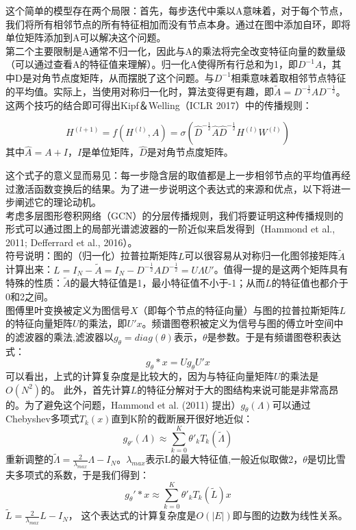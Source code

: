 \documentclass[a4paper,UTF8]{article}
\begin{document}
这个简单的模型存在两个局限：首先，每步迭代中乘以A意味着，对于每个节点，我们将所有相邻节点的所有特征相加而没有节点本身。通过在图中添加自环，即将单位矩阵添加到A可以解决这个问题。\\

第二个主要限制是A通常不归一化，因此与A的乘法将完全改变特征向量的数量级（可以通过查看A的特征值来理解）。归一化A使得所有行总和为1，即$D^{-1}A$，其中D是对角节点度矩阵，从而摆脱了这个问题。与$D^{-1}$相乘意味着取相邻节点特征的平均值。实际上，当使用对称归一化时，算法变得更有趣，即$\widetilde{A}={D}^{-\frac{1}{2}} {A} {D}^{-\frac{1}{2}} $。这两个技巧的结合即可得出Kipf＆Welling（ICLR 2017）中的传播规则：

\[ H^{(l+1)} = f(H^{(l)},A) = \sigma \left( \hat{D}^{-\frac{1}{2}} \hat{A} \hat{D}^{-\frac{1}{2}} H^{(l)}W^{(l)}\right)\]
其中$\hat{A}= A + I$，$I$是单位矩阵，$\hat{D}$是对角节点度矩阵。

这个式子的意义显而易见：每一步隐含层的取值都是上一步相邻节点的平均值再经过激活函数变换后的结果。为了进一步说明这个表达式的来源和优点，以下将进一步阐述它的理论动机。\\

考虑多层图形卷积网络（GCN）的分层传播规则，我们将要证明这种传播规则的形式可以通过图上的局部光谱滤波器的一阶近似来启发得到（Hammond et al., 2011; Defferrard et al., 2016）。\\

符号说明：图的（归一化）拉普拉斯矩阵$L$可以很容易从对称归一化图邻接矩阵$\widetilde{A}$计算出来：$L = I_N-\widetilde{A} = I_N-{D}^{-\frac{1}{2}} {A} {D}^{-\frac{1}{2}} = U \Lambda U'$。值得一提的是这两个矩阵具有特殊的性质：$\widetilde{A}$的最大特征值是1，最小特征值不小于-1；从而$L$的特征值也都介于0和2之间。\\

图傅里叶变换被定义为图信号$X$（即每个节点的特征向量）与图的拉普拉斯矩阵$L$的特征向量矩阵$U$的乘法，即$U'x$。频谱图卷积被定义为信号与图的傅立叶空间中的滤波器的乘法,滤波器以$g_\theta=diag(\theta)$表示，$\theta$是参数。于是有频谱图卷积表达式：
$$g_\theta \ast x = U g_\theta U' x$$
可以看出，上式的计算复杂度是比较大的，因为与特征向量矩阵$U$的乘法是$O(N^2)$的。 此外，首先计算$L$的特征分解对于大的图结构来说可能是非常高昂的。为了避免这个问题，Hammond et al. (2011) 提出）$g_{\theta}(\Lambda)$可以通过Chebyshev多项式$T_k(x)$直到K阶的截断展开很好地近似：
$$g_{\theta'}(\Lambda)\approx\sum\limits_{k=0}^K \theta'_k T_k(\widetilde{\Lambda})$$
重新调整的$\widetilde{\Lambda}=\frac{2}{\lambda_{max}}\Lambda-I_N$。$\lambda_{max}$表示L的最大特征值,一般近似取做2，$\theta$是切比雪夫多项式的系数，于是我们得到：
$$g_\theta' \ast x \approx \sum\limits_{k=0}^K \theta'_k T_k(\widetilde{L})x $$
$\widetilde{L}=\frac{2}{\lambda_{max}}L-I_N$，
这个表达式的计算复杂度是$O(\vert E \vert)$即与图的边数为线性关系。\\
\end{document}
